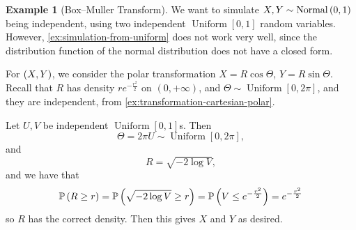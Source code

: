\documentclass{article}
\theoremstyle{definition}
\newtheorem{example}[theorem]{Example}
\theoremstyle{remark}
\newcommand{\Prob}{\mathbb{P}}
\newcommand{\plusinfty}{+\infty}
\newcommand{\ccintv}[2]{[#1,#2]}
\newcommand{\oointv}[2]{(#1,#2)}
\newcommand{\flatfrac}[2]{\frac{#1}{#2}}
\newcommand{\Uniform}{\operatorname{Uniform}}
\newcommand{\Normal}{\operatorname{Normal}}
\begin{document}
\begin{example}[Box--Muller Transform]
    \label{ex:box-muller}%
    We want to simulate \(X, Y \sim \Normal\pqty{0, 1}\) being independent, using two independent \(\Uniform\ccintv{0}{1}\) random variables. However, \autoref{ex:simulation-from-uniform} does not work very well, since the distribution function of the normal distribution does not have a closed form.

    For \(\left(X, Y\right)\), we consider the polar transformation \(X = R \cos \Theta\), \(Y = R \sin \Theta\). Recall that \(R\) has density \(r e^{- \flatfrac{r^2}{2}}\) on \(\oointv{0}{\plusinfty}\), and \(\Theta \sim \Uniform \ccintv{0}{2\pi}\), and they are independent, from \autoref{ex:transformation-cartesian-polar}.

    Let \(U, V\) be independent \(\Uniform\ccintv{0}{1}\)s. Then
    \[
        \Theta = 2 \pi U \sim \Uniform \ccintv{0}{2\pi},
    \]
    and
    \[
        R = \sqrt{- 2 \log V},
    \]
    and we have that
    \[
        \Prob\pqty{R \geq r} = \Prob\pqty{\sqrt{- 2 \log V} \geq r} = \Prob\pqty{V \leq e^{- \flatfrac{r^2}{2}}} = e^{- \flatfrac{r^2}{2}}
    \]
    so \(R\) has the correct density. Then this gives \(X\) and \(Y\) as desired.
\end{example}
\end{document}
